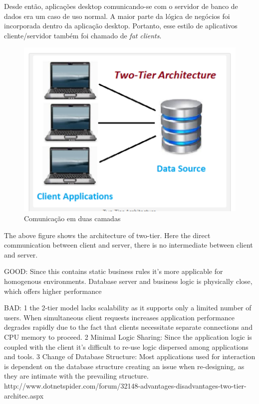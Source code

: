 Desde então, aplicações desktop comunicando-se com o servidor de banco de dados era um caso de uso normal. A maior parte da lógica de negócios foi incorporada dentro da aplicação desktop. Portanto, esse estilo de aplicativos cliente/servidor também foi chamado de \textit{fat clients}. 

\begin{figure}[ht]
    \centering
    \includegraphics[width=1\textwidth]{figuras/two-tier.png}
    \caption{Comunicação em duas camadas}
    \label{fig:two-tier}
\end{figure}

The above figure shows the architecture of two-tier. Here the direct communication between client and server, there is no intermediate between client and server. 

GOOD: Since this contains static business rules it’s more applicable for homogenous environments. Database server and business logic is physically close, which offers higher performance

BAD: 
1 the 2-tier model lacks scalability as it supports only a limited number of users. When simultaneous client requests increases application performance degrades rapidly due to the fact that clients necessitate separate connections and CPU memory to proceed. 
2 Minimal Logic Sharing: Since the application logic is coupled with the client it’s difficult to re-use logic dispersed among applications and tools.
3 Change of Database Structure: Most applications used for interaction is dependent on the database structure creating an issue when re-designing, as they are intimate with the prevailing structure.
http://www.dotnetspider.com/forum/32148-advantages-disadvantages-two-tier-architec.aspx

